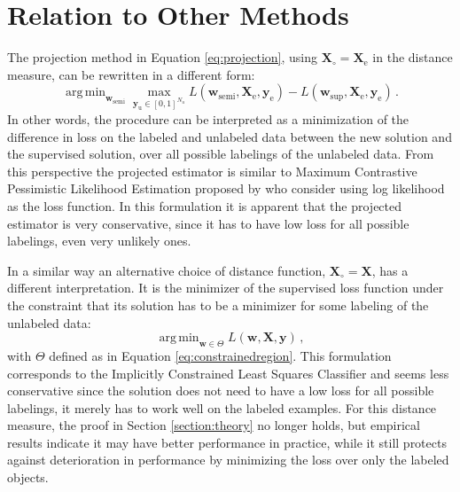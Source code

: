 \documentclass[smallcondensed]{svjour3}\usepackage[]{graphicx}\usepackage[]{color}
\newcommand{\Xe}{\vec{X}_\mathrm{e}  }
\renewcommand{\vec}[1]{\mathbf{#1}}
\DeclareMathOperator*{\argmin}{arg\,min}
\begin{document}
\section{Relation to Other Methods}
\label{section:interpretations}
The projection method in Equation \eqref{eq:projection}, using $\vec{X}_{\circ}=\Xe$ in the distance measure, can be rewritten in a different form:
\begin{equation}
\argmin_{\vec{w}_\text{semi}} \max_{\vec{y}_\text{u} \in [0,1]^{N_u}} L(\vec{w}_\text{semi},\Xe,\vec{y}_\text{e}) - L(\vec{w}_\text{sup},\Xe,\vec{y}_\text{e}) \,. \nonumber
\end{equation}
In other words, the procedure can be interpreted as a minimization of the difference in loss on the labeled and unlabeled data between the new solution and the supervised solution, over all possible labelings of the unlabeled data. From this perspective the projected estimator is similar to Maximum Contrastive Pessimistic Likelihood Estimation proposed by \citet{Loog2016} who consider using log likelihood as the loss function. In this formulation it is apparent that the projected estimator is very conservative, since it has to have low loss for all possible labelings, even very unlikely ones.

In a similar way an alternative choice of distance function, $\vec{X}_{\circ}=\vec{X}$, has a different interpretation. It is the minimizer of the supervised loss function under the constraint that its solution has to be a minimizer for some labeling of the unlabeled data:
\begin{equation}
\argmin_{\vec{w} \in \Theta} L(\vec{w},\vec{X},\vec{y}) \,, \nonumber
\end{equation}
with $\Theta$ defined as in Equation \eqref{eq:constrainedregion}. This formulation corresponds to the Implicitly Constrained Least Squares Classifier \citep{Krijthe2015} and seems less conservative since the solution does not need to have a low loss for all possible labelings, it merely has to work well on the labeled examples. For this distance measure, the proof in Section \ref{section:theory} no longer holds, but empirical results indicate it may have better performance in practice, while it still protects against deterioration in performance by minimizing the loss over only the labeled objects.
\end{document}
